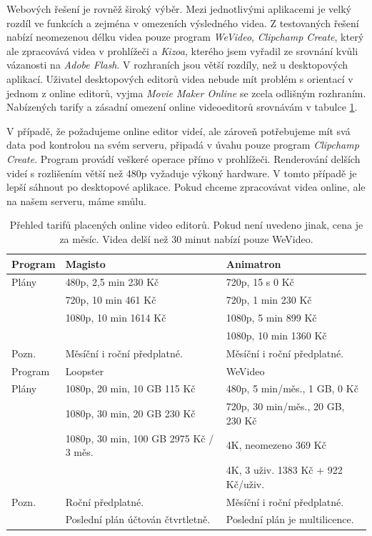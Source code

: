 Webových řešení je rovněž široký výběr. Mezi jednotlivými aplikacemi je velký rozdíl ve funkcích a zejména v omezeních výsledného videa. Z testovaných řešení nabízí neomezenou délku videa pouze program \textit{WeVideo}, \textit{Clipchamp Create}, který ale zpracovává videa v prohlížeči a \textit{Kizoa}, kterého jsem vyřadil ze srovnání kvůli vázanosti na \textit{Adobe Flash}. V rozhraních jsou větší rozdíly, než u desktopových aplikací. Uživatel desktopových editorů videa nebude mít problém s orientací v jednom z online editorů, vyjma \textit{Movie Maker Online} se zcela odlišným rozhraním. Nabízených tarify a zásadní omezení online videoeditorů srovnávám v tabulce \ref{tab:prices}.

V případě, že požadujeme online editor videí, ale zároveň potřebujeme mít svá data pod kontrolou na svém serveru, připadá v úvahu pouze program \textit{Clipchamp Create}. Program provádí veškeré operace přímo v prohlížeči. Renderování delších videí s rozlišením větší než 480p vyžaduje výkoný hardware. V tomto případě je lepší sáhnout po desktopové aplikace. Pokud chceme zpracovávat videa online, ale na našem serveru, máme smůlu.

\begin{table}[h]
    \centering
    \begin{tabular}{|l|l|l|}
    \hline
    Program   & Magisto & Animatron\\
    \hline
    Plány   & 480p, 2,5 min 230 Kč & 720p, 15 s 0 Kč\\
            & 720p, 10 min 461 Kč   & 720p, 1 min 230 Kč\\
            & 1080p, 10 min 1614 Kč & 1080p, 5 min 899 Kč\\
            &                       & 1080p, 10 min 1360 Kč\\
    \hline
    Pozn.   & Měsíční i roční předplatné. & Měsíční i roční předplatné.\\
    \hline
    \hline
    Program & Loopster                                  & WeVideo\\
    \hline
    Plány   & 1080p, 20 min, 10 GB 115 Kč               & 480p, 5 min/měs., 1 GB, 0 Kč\\
            & 1080p, 30 min, 20 GB 230 Kč               & 720p, 30 min/měs., 20 GB, 230 Kč\\
            & 1080p, 30 min, 100 GB 2975 Kč / 3 měs.    & 4K, neomezeno 369 Kč\\
            &                                           & 4K, 3 uživ. 1383 Kč + 922 Kč/uživ.\\
    \hline
    Pozn.   & Roční předplatné.                         & Měsíční i roční předplatné.\\
            & Poslední plán účtován čtvrtletně.         & Poslední plán je multilicence.\\
    \hline
    \end{tabular}
    \caption{Přehled tarifů placených online video editorů. Pokud není uvedeno jinak, cena je za měsíc. Videa delší než 30 minut nabízí pouze WeVideo.}
    \label{tab:prices}
\end{table}


